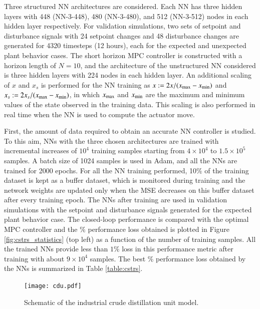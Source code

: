 \documentclass[preprint,5p, twocolumn, authoryear]{elsarticle}
\begin{document}
Three structured NN architectures are considered. Each NN has three hidden
layers with 448 (NN-3-448), 480 (NN-3-480), and 512 (NN-3-512) nodes in each
hidden layer respectively. For validation simulations, two sets of setpoint and
disturbance signals with 24 setpoint changes and 48 disturbance changes are
generated for 4320 timesteps (12 hours), each for the expected and unexpected
plant behavior cases. The short horizon MPC controller is constructed with a
horizon length of $N = 10$, and the architecture of the unstructured NN
considered is three hidden layers with 224 nodes in each hidden layer. An
additional scaling of $x$ and $x_s$ is performed for the NN training as $x :=
2x/(x_{\textnormal{max}} - x_{\textnormal{min}})$ and $x_s :=
2x_s/(x_{\textnormal{max}} - x_{\textnormal{min}})$, in which
$x_{\textnormal{max}}$ and $x_{\textnormal{min}}$ are the maximum and minimum
values of the state observed in the training data. This scaling is also
performed in real time when the NN is used to compute the actuator move. 

First, the amount of data required to obtain an accurate NN controller is
studied. To this aim, NNs with the three chosen architectures are trained with
incremental increases of $10^4$ training samples starting from $4 \times 10^4$
to $1.5 \times 10^5$ samples. A batch size of 1024 samples is used in Adam, and
all the NNs are trained for 2000 epochs. For all the NN training performed,
10$\%$ of the training dataset is kept as a buffer dataset, which is monitored
during training and the network weights are updated only when the MSE decreases
on this buffer dataset after every training epoch. The NNs after training are
used in validation simulations with the setpoint and disturbance signals
generated for the expected plant behavior case. The closed-loop performance is
compared with the optimal MPC controller and the $\%$ performance loss obtained
is plotted in Figure \ref{fig:cstrs_statistics} (top left) as a function of the
number of training samples. All the trained NNs provide less than $1 \%$ loss in
this performance metric after training with about $9 \times 10^4$ samples. The
best $\%$ performance loss obtained by the NNs is summarized in Table
\ref{table:cstrs}. 

\begin{figure}[!h]
    \centering
    \texttt{[image: cdu.pdf]}
    \caption{Schematic of the industrial crude distillation unit model.}
    \label{fig:schematic_cdu}
\end{figure}
\end{document}
